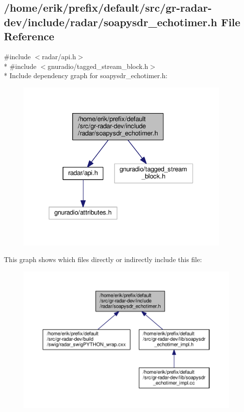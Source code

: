 \subsection{/home/erik/prefix/default/src/gr-\/radar-\/dev/include/radar/soapysdr\+\_\+echotimer.h File Reference}
\label{soapysdr__echotimer_8h}
{\ttfamily \#include $<$radar/api.\+h$>$}\\*
{\ttfamily \#include $<$gnuradio/tagged\+\_\+stream\+\_\+block.\+h$>$}\\*
Include dependency graph for soapysdr\+\_\+echotimer.\+h\+:
\nopagebreak
\begin{figure}[H]
\begin{center}
\leavevmode
\includegraphics[width=302pt]{d6/d09/soapysdr__echotimer_8h__incl}
\end{center}
\end{figure}
This graph shows which files directly or indirectly include this file\+:
\nopagebreak
\begin{figure}[H]
\begin{center}
\leavevmode
\includegraphics[width=350pt]{dd/d00/soapysdr__echotimer_8h__dep__incl}
\end{center}
\end{figure}
